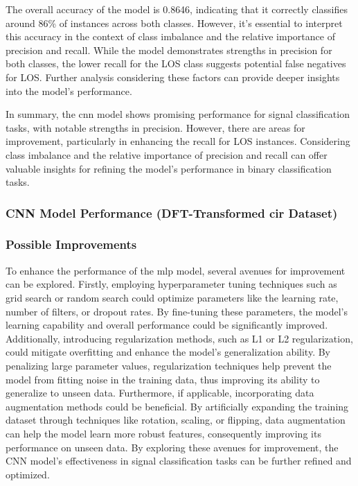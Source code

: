 The overall accuracy of the model is 0.8646, indicating that it correctly classifies around 86\% of instances across both classes. However, it's essential to interpret this accuracy in the context of class imbalance and the relative importance of precision and recall. While the model demonstrates strengths in precision for both classes, the lower recall for the LOS class suggests potential false negatives for LOS. Further analysis considering these factors can provide deeper insights into the model's performance.

In summary, the \gls{cnn} model shows promising performance for signal classification tasks, with notable strengths in precision. However, there are areas for improvement, particularly in enhancing the recall for LOS instances. Considering class imbalance and the relative importance of precision and recall can offer valuable insights for refining the model's performance in binary classification tasks.

\subsubsection{CNN Model Performance (DFT-Transformed \gls{cir} Dataset)}



\subsubsection{Possible Improvements}

To enhance the performance of the \gls{mlp} model, several avenues for improvement can be explored. Firstly, employing hyperparameter tuning techniques such as grid search or random search could optimize parameters like the learning rate, number of filters, or dropout rates. By fine-tuning these parameters, the model's learning capability and overall performance could be significantly improved. Additionally, introducing regularization methods, such as L1 or L2 regularization, could mitigate overfitting and enhance the model's generalization ability. By penalizing large parameter values, regularization techniques help prevent the model from fitting noise in the training data, thus improving its ability to generalize to unseen data. Furthermore, if applicable, incorporating data augmentation methods could be beneficial. By artificially expanding the training dataset through techniques like rotation, scaling, or flipping, data augmentation can help the model learn more robust features, consequently improving its performance on unseen data. By exploring these avenues for improvement, the CNN model's effectiveness in signal classification tasks can be further refined and optimized.

